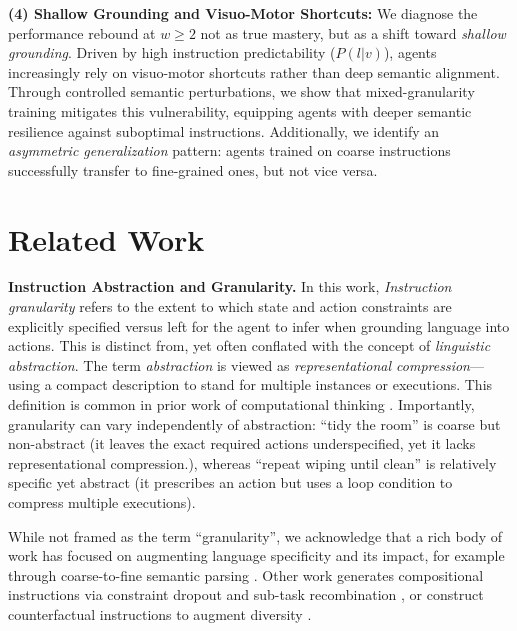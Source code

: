 \documentclass[11pt]{article}
\begin{document}
\textbf{(4) Shallow Grounding and Visuo-Motor Shortcuts:} We diagnose the performance rebound at $w \ge 2$ not as true mastery, but as a shift toward \emph{shallow grounding}. Driven by high instruction predictability ($P(l|v)$), agents increasingly rely on visuo-motor shortcuts rather than deep semantic alignment. Through controlled semantic perturbations, we show that mixed-granularity training mitigates this vulnerability, equipping agents with deeper semantic resilience against suboptimal instructions. Additionally, we identify an \emph{asymmetric generalization} pattern: agents trained on coarse instructions successfully transfer to fine-grained ones, but not vice versa.




\section{Related Work}
\label{sec:related_work}

\textbf{Instruction Abstraction and Granularity.}
In this work, \emph{Instruction granularity} refers to the extent to which state and action constraints are explicitly specified versus left for the agent to infer when grounding language into actions.
This is distinct from, yet often conflated with the concept of \emph{linguistic abstraction}.
The term \emph{abstraction} is viewed as \emph{representational compression}---using a compact description to stand for multiple instances or executions. This definition is common in prior work of computational thinking \citep{Wing2010ComputationalTW,DBLP:journals/tacl/LachmyPMT22,DBLP:conf/iclr/ZhengMCCCLZ24}.
Importantly, granularity can vary independently of abstraction: ``tidy the room'' is coarse but non-abstract (it leaves the exact required actions underspecified, yet it lacks representational compression.), whereas ``repeat wiping until clean'' is relatively specific yet abstract (it prescribes an action but uses a loop condition to compress multiple executions).

While not framed as the term ``granularity'', we acknowledge that a rich body of work has focused on augmenting language specificity and its impact, for example through coarse-to-fine semantic parsing \citep{dong-lapata-2018-coarse,DBLP:conf/ijcai/LiLF020}.
Other work generates compositional instructions via constraint dropout and sub-task recombination \citep{huang-etal-2025-musc}, or construct counterfactual instructions to augment diversity \citep{glossop2025castcounterfactuallabelsimprove}.
\end{document}

